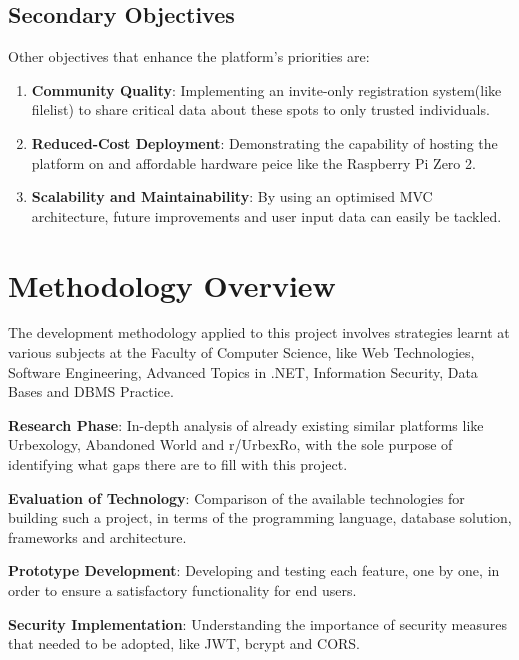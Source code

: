 \documentclass[12pt,a4paper]{report}
\begin{document}
\subsection*{Secondary Objectives}

Other objectives that enhance the platform's priorities are:

\begin{enumerate}
    \item \textbf{Community Quality}: Implementing an invite-only registration system(like filelist) to share critical data about these spots to only trusted individuals.
    
    \item \textbf{Reduced-Cost Deployment}: Demonstrating the capability of hosting the platform on and affordable hardware peice like the Raspberry Pi Zero 2.
    
    \item \textbf{Scalability and Maintainability}: By using an optimised MVC architecture, future improvements and user input data can easily be tackled.

\end{enumerate}

\section*{Methodology Overview}

The development methodology applied to this project involves strategies learnt at various subjects at the Faculty of Computer Science, like Web Technologies, Software Engineering, Advanced Topics in .NET, Information Security, Data Bases and DBMS Practice.

\textbf{Research Phase}: In-depth analysis of already existing similar platforms like Urbexology, Abandoned World and r/UrbexRo, with the sole purpose of identifying what gaps there are to fill with this project.

\textbf{Evaluation of Technology}: Comparison of the available technologies for building such a project, in terms of the programming language, database solution, frameworks and architecture.

\textbf{Prototype Development}: Developing and testing each feature, one by one, in order to ensure a satisfactory functionality for end users.

\textbf{Security Implementation}: Understanding the importance of security measures that needed to be adopted, like JWT, bcrypt and CORS.
\end{document}
